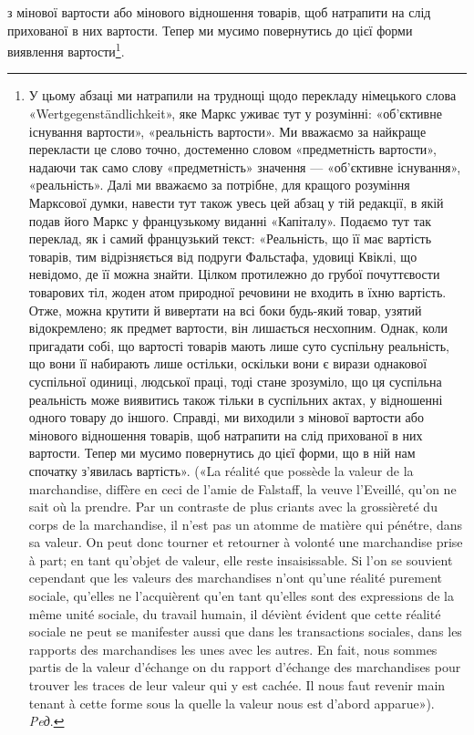 \parcont{}  %
з мінової вартости або мінового відношення товарів, щоб натрапити
на слід прихованої в них вартости. Тепер ми мусимо повернутись
до цієї форми виявлення вартости\footnote*{
У цьому абзаці ми натрапили на труднощі щодо перекладу німецького
слова «\textgerman{Wertgegenständlichkeit}», яке Маркс уживає тут у розумінні:
«об’єктивне існування вартости», «реальність вартости». Ми
вважаємо за найкраще перекласти це слово точно, достеменно словом
«предметність вартости», надаючи так само слову «предметність» значення
— «об’єктивне існування», «реальність». Далі ми вважаємо за
потрібне, для кращого розуміння Марксової думки, навести тут також
увесь цей абзац у тій редакції, в якій подав його Маркс у французькому
виданні «Капіталу». Подаємо тут так переклад, як і самий французький
текст: «Реальність, що її має вартість товарів, тим відрізняється від
подруги Фальстафа, удовиці Квіклі, що невідомо, де її можна знайти.
Цілком протилежно до грубої почуттєвости товарових тіл, жоден атом
природної речовини не входить в їхню вартість. Отже, можна крутити й
вивертати на всі боки будь-який товар, узятий відокремлено; як предмет
вартости, він лишається несхопним. Однак, коли пригадати собі, що
вартості товарів мають лише суто суспільну реальність, що вони її набирають
лише остільки, оскільки вони є вирази однакової суспільної одиниці,
людської праці, тоді стане зрозуміло, що ця суспільна реальність
може виявитись також тільки в суспільних актах, у відношенні одного
товару до іншого. Справді, ми виходили з мінової вартости або мінового
відношення товарів, щоб натрапити на слід прихованої в них вартости.
Тепер ми мусимо повернутись до цієї форми, що в ній нам спочатку з’явилась
вартість». («La réalité que possède la valeur de la marchandise, diffère
en ceci de l’amie de Falstaff, la veuve l’Eveillé, qu’on ne sait où la prendre.
Par un contraste de plus criants avec la grossièreté du corps de la marchandise,
il n’est pas un atomme de matière qui pénétre, dans sa valeur. On peut
donc tourner et retourner à volonté une marchandise prise à part; en tant
qu’objet de valeur, elle reste insaisissable. Si l’on se souvient cependant
que les valeurs des marchandises n’ont qu’une réalité purement sociale,
qu’elles ne l’acquièrent qu’en tant qu’elles sont des expressions de la même
unité sociale, du travail humain, il déviènt évident que cette réalité sociale
ne peut se manifester aussi que dans les transactions sociales, dans les
rapports des marchandises les unes avec les autres. En fait, nous sommes
partis de la valeur d’échange on du rapport d’échange des marchandises
pour trouver les traces de leur valeur qui y est cachée. Il nous faut revenir
main tenant à cette forme sous la quelle la valeur nous est d’abord
apparue»). \emph{Peд}.
}.

